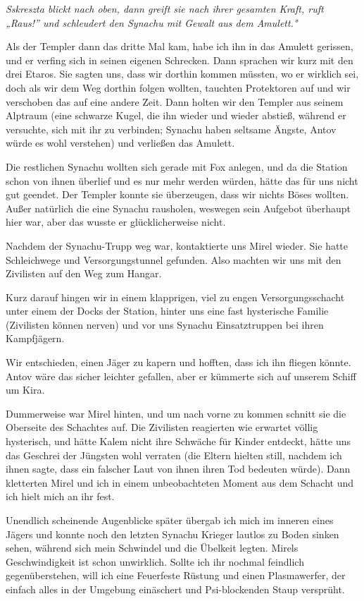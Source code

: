 \documentclass[11pt]{scrartcl}
\begin{document}
\emph{Sskreszta blickt nach oben, dann greift sie nach ihrer gesamten
Kraft, ruft „Raus!'' und schleudert den Synachu mit Gewalt aus dem
Amulett.°}

Als der Templer dann das dritte Mal kam, habe ich ihn in das Amulett
gerissen, und er verfing sich in seinen eigenen Schrecken. Dann sprachen
wir kurz mit den drei Etaros. Sie sagten uns, dass wir dorthin kommen
müssten, wo er wirklich sei, doch als wir dem Weg dorthin folgen
wollten, tauchten Protektoren auf und wir verschoben das auf eine andere
Zeit. Dann holten wir den Templer aus seinem Alptraum (eine schwarze
Kugel, die ihn wieder und wieder abstieß, während er versuchte, sich mit
ihr zu verbinden; Synachu haben seltsame Ängste, Antov würde es wohl
verstehen) und verließen das Amulett.

Die restlichen Synachu wollten sich gerade mit Fox anlegen, und da die
Station schon von ihnen überlief und es nur mehr werden würden, hätte
das für uns nicht gut geendet. Der Templer konnte sie überzeugen, dass
wir nichts Böses wollten. Außer natürlich die eine Synachu rausholen,
weswegen sein Aufgebot überhaupt hier war, aber das wusste er
glücklicherweise nicht.

Nachdem der Synachu-Trupp weg war, kontaktierte uns Mirel wieder. Sie
hatte Schleichwege und Versorgungstunnel gefunden. Also machten wir uns
mit den Zivilisten auf den Weg zum Hangar.

Kurz darauf hingen wir in einem klapprigen, viel zu engen
Versorgungsschacht unter einem der Docks der Station, hinter uns eine
fast hysterische Familie (Zivilisten können nerven) und vor uns Synachu
Einsatztruppen bei ihren Kampfjägern.

Wir entschieden, einen Jäger zu kapern und hofften, dass ich ihn fliegen
könnte. Antov wäre das sicher leichter gefallen, aber er kümmerte sich
auf unserem Schiff um Kira.

Dummerweise war Mirel hinten, und um nach vorne zu kommen schnitt sie
die Oberseite des Schachtes auf. Die Zivilisten reagierten wie erwartet
völlig hysterisch, und hätte Kalem nicht ihre Schwäche für Kinder
entdeckt, hätte uns das Geschrei der Jüngsten wohl verraten (die Eltern
hielten still, nachdem ich ihnen sagte, dass ein falscher Laut von ihnen
ihren Tod bedeuten würde). Dann kletterten Mirel und ich in einem
unbeobachteten Moment aus dem Schacht und ich hielt mich an ihr fest.

Unendlich scheinende Augenblicke später übergab ich mich im inneren
eines Jägers und konnte noch den letzten Synachu Krieger lautlos zu
Boden sinken sehen, während sich mein Schwindel und die Übelkeit legten.
Mirels Geschwindigkeit ist schon unwirklich. Sollte ich ihr nochmal
feindlich gegenüberstehen, will ich eine Feuerfeste Rüstung und einen
Plasmawerfer, der einfach alles in der Umgebung einäschert und
Psi-blockenden Staup versprüht.
\end{document}
